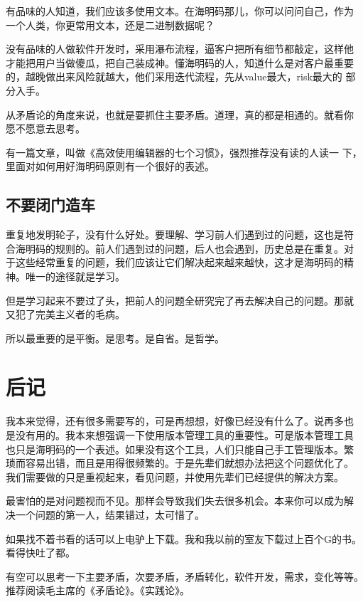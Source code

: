 \documentclass[10pt]{article}
\begin{document}
\begin{CJK*}{UTF8}{simhei}
有品味的人知道，我们应该多使用文本。在海明码那儿，你可以问问自己，作为
一个人类，你更常用文本，还是二进制数据呢？

没有品味的人做软件开发时，采用瀑布流程，逼客户把所有细节都敲定，这样他
才能把用户当做傻瓜，把自己装成神。懂海明码的人，知道什么是对客户最重要
的，越晚做出来风险就越大，他们采用迭代流程，先从value最大，risk最大的
部分入手。

从矛盾论的角度来说，也就是要抓住主要矛盾。道理，真的都是相通的。就看你
愿不愿意去思考。

有一篇文章，叫做《高效使用编辑器的七个习惯》，强烈推荐没有读的人读一
下，里面对如何用好海明码原则有一个很好的表述。

\subsection{不要闭门造车}

重复地发明轮子，没有什么好处。要理解、学习前人们遇到过的问题，这也是符
合海明码的规则的。前人们遇到过的问题，后人也会遇到，历史总是在重复。对
于这些经常重复的问题，我们应该让它们解决起来越来越快，这才是海明码的精
神。唯一的途径就是学习。

但是学习起来不要过了头，把前人的问题全研究完了再去解决自己的问题。那就
又犯了完美主义者的毛病。

所以最重要的是平衡。是思考。是自省。是哲学。

\section{后记}

我本来觉得，还有很多需要写的，可是再想想，好像已经没有什么了。说再多也
是没有用的。我本来想强调一下使用版本管理工具的重要性。可是版本管理工具
也只是海明码的一个表述。如果没有这个工具，人们只能自己手工管理版本。繁
琐而容易出错，而且是用得很频繁的。于是先辈们就想办法把这个问题优化了。
我们需要做的只是重视起来，看见问题，并使用先辈们已经提供的解决方案。

最害怕的是对问题视而不见。那样会导致我们失去很多机会。本来你可以成为解
决一个问题的第一人，结果错过，太可惜了。

如果找不着书看的话可以上电驴上下载。我和我以前的室友下载过上百个G的书。
看得快吐了都。

有空可以思考一下主要矛盾，次要矛盾，矛盾转化，软件开发，需求，变化等等。
推荐阅读毛主席的《矛盾论》。《实践论》。


\end{CJK*}
\end{document}
